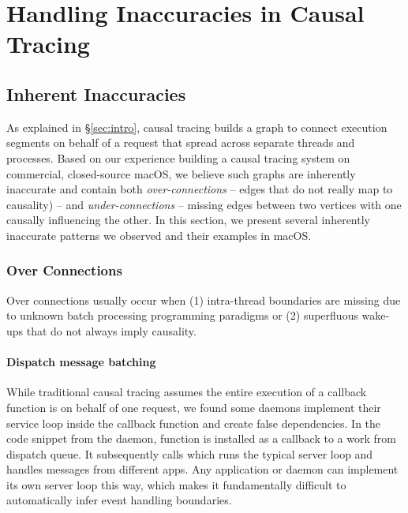 \section{Handling Inaccuracies in Causal Tracing}\label{sec:inaccuracy}

\subsection{Inherent Inaccuracies}


As explained in \S\ref{sec:intro}, causal tracing builds a graph to connect
execution segments on behalf of a request that spread across separate threads
and processes. Based on our experience building a causal tracing system
on commercial, closed-source macOS, we believe such graphs are inherently
inaccurate and contain both \emph{over-connections} -- edges that do not really
map to causality) -- and \emph{under-connections} -- missing edges between two
vertices with one causally influencing the other. In this section, we present
several inherently inaccurate patterns we observed and their examples in macOS.

\subsubsection{Over Connections} \label{subsec:overconnections}

Over connections usually occur when (1) intra-thread boundaries are missing due
to unknown batch processing programming paradigms or (2) superfluous wake-ups
that do not always imply causality.

\paragraph{Dispatch message batching}

While traditional causal tracing assumes the entire execution of a callback
function is on behalf of one request, we found some daemons implement their
service loop inside the callback function and create false dependencies. In the
code snippet from the  daemon, function 
is installed as a callback to a work from dispatch queue. It subsequently calls
 which runs the typical server loop and handles
messages from different apps.
Any application or daemon can implement its own server loop
this way, which makes it fundamentally difficult to automatically infer event
handling boundaries.


